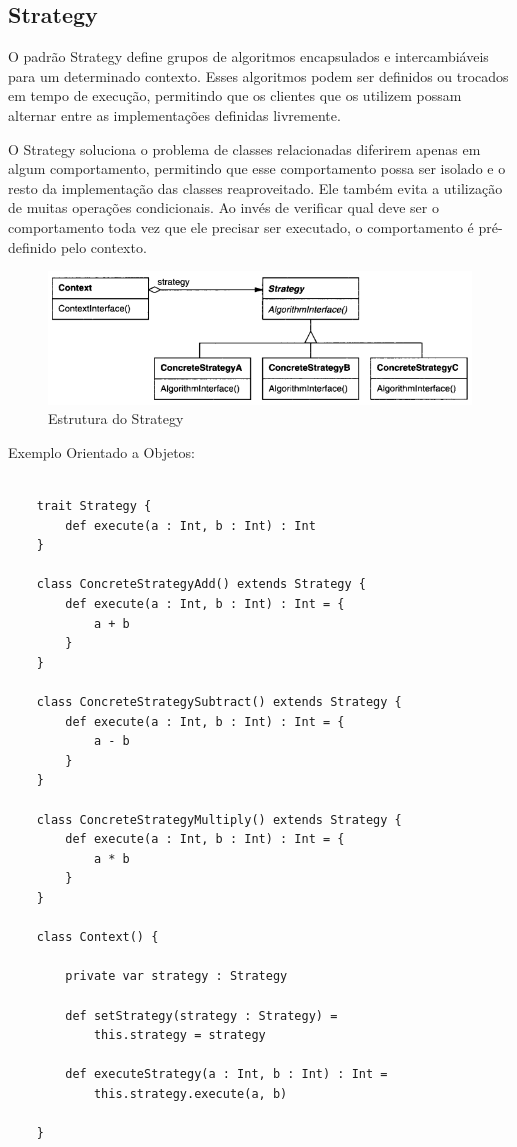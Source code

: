 \subsection{Strategy}

O padrão Strategy define grupos de algoritmos encapsulados e
 intercambiáveis para um determinado contexto. Esses 
 algoritmos podem ser definidos ou trocados em tempo de 
 execução, permitindo que os clientes que os utilizem possam
  alternar entre as implementações definidas livremente.

O Strategy soluciona o problema de classes relacionadas 
diferirem apenas em algum comportamento, permitindo que 
esse comportamento possa ser isolado e o resto da implementação 
das classes reaproveitado. Ele também evita a utilização de 
muitas operações condicionais. Ao invés de verificar qual 
deve ser o comportamento toda vez que ele precisar ser 
executado, o comportamento é pré-definido pelo contexto.

\begin{figure}[htb]
	\caption{\label{fig_grafico}Estrutura do Strategy}
	\begin{center}
	    \includegraphics[scale=0.5]{5_padroes-contexto-funcional/5.3_comportamentais/5.3.9_strategy/diagram.png}
	\end{center}
\end{figure}

Exemplo Orientado a Objetos:

\begin{lstlisting}[caption={Strategy Orientação a Objetos},label=oostrategy]
    
    trait Strategy {
        def execute(a : Int, b : Int) : Int
    }

    class ConcreteStrategyAdd() extends Strategy {
        def execute(a : Int, b : Int) : Int = {
            a + b
        }
    }

    class ConcreteStrategySubtract() extends Strategy {
        def execute(a : Int, b : Int) : Int = {
            a - b
        }
    }

    class ConcreteStrategyMultiply() extends Strategy {
        def execute(a : Int, b : Int) : Int = {
            a * b
        }
    }

    class Context() {
        
        private var strategy : Strategy

        def setStrategy(strategy : Strategy) =
            this.strategy = strategy

        def executeStrategy(a : Int, b : Int) : Int =
            this.strategy.execute(a, b)

    }

\end{lstlisting}

